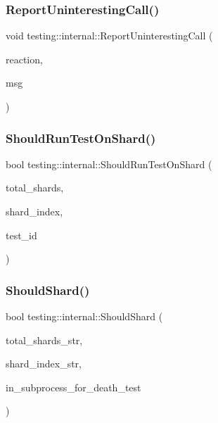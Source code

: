 \mbox{\label{namespacetesting_1_1internal_a8d99a1e87d0cea563b2bfad8a4e65276}} 
\subsubsection{\texorpdfstring{Report\+Uninteresting\+Call()}{ReportUninterestingCall()}}
{\footnotesize\ttfamily void testing\+::internal\+::\+Report\+Uninteresting\+Call (\begin{DoxyParamCaption}\item[{\hyperlink{namespacetesting_1_1internal_adfcd859062983a889f4bd18e6977357e}{Call\+Reaction}}]{reaction,  }\item[{const \hyperlink{namespacetesting_1_1internal_a8e8ff5b11e64078831112677156cb111}{string} \&}]{msg }\end{DoxyParamCaption})}

\mbox{\label{namespacetesting_1_1internal_a437bd89f5bc532778d7467600e210395}} 
\subsubsection{\texorpdfstring{Should\+Run\+Test\+On\+Shard()}{ShouldRunTestOnShard()}}
{\footnotesize\ttfamily bool testing\+::internal\+::\+Should\+Run\+Test\+On\+Shard (\begin{DoxyParamCaption}\item[{int}]{total\+\_\+shards,  }\item[{int}]{shard\+\_\+index,  }\item[{int}]{test\+\_\+id }\end{DoxyParamCaption})}

\mbox{\label{namespacetesting_1_1internal_a0fe41657b1d1ab7ec4e37ec07403ee6c}} 
\subsubsection{\texorpdfstring{Should\+Shard()}{ShouldShard()}}
{\footnotesize\ttfamily bool testing\+::internal\+::\+Should\+Shard (\begin{DoxyParamCaption}\item[{const char $\ast$}]{total\+\_\+shards\+\_\+str,  }\item[{const char $\ast$}]{shard\+\_\+index\+\_\+str,  }\item[{bool}]{in\+\_\+subprocess\+\_\+for\+\_\+death\+\_\+test }\end{DoxyParamCaption})}

